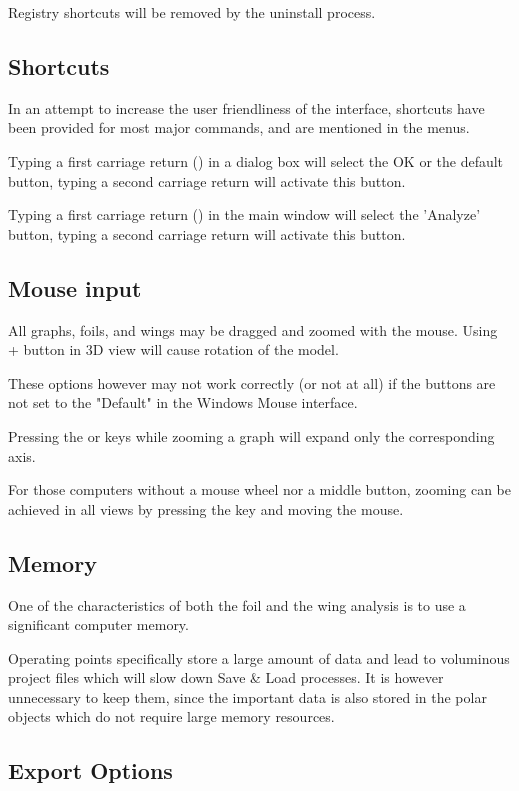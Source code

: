 \documentclass[a4paper,twoside,12pt,dvips]{article}
\begin{document}
Registry shortcuts will be removed by the uninstall process.

\subsection{Shortcuts}
In an attempt to increase the user friendliness of the interface,
shortcuts have been provided for most major commands, and are mentioned
in the menus.

Typing a first carriage return (\Return) in a dialog box will select
the OK or the default button, typing a second carriage return will
activate this button.

Typing a first carriage return (\Return) in the main window will
select the 'Analyze' button, typing a second carriage return will
activate this button.

\subsection{Mouse input}

All graphs, foils, and wings may be dragged and zoomed with the mouse.
Using \Ctrl + \LArrow button in 3D view will cause rotation of the model.

These options however may not work correctly (or not at all) if the
buttons are not set to the "Default" in the Windows Mouse interface.

Pressing the  or  keys while zooming a graph
will expand only the corresponding axis.

For those computers without a mouse wheel nor a middle button, zooming
can be achieved in all views by pressing the  key and
moving the mouse.

\subsection{Memory}

One of the characteristics of both the foil and the wing analysis is
to use a significant computer memory.

Operating points specifically store a large amount of data and lead to
voluminous project files which will slow down Save \& Load processes.
It is however unnecessary to keep them, since the important data is
also stored in the polar objects which do not require large memory
resources.

\subsection{Export Options}
\end{document}
